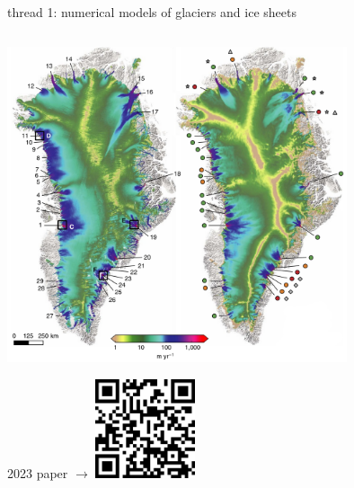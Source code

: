 \documentclass[svgnames,
               hyperref={colorlinks,citecolor=DeepPink4,linkcolor=FireBrick,urlcolor=Maroon},
               usepdftitle=false]  %
               {beamer}
\begin{document}
\begin{frame}{thread 1: numerical models of glaciers and ice sheets}
\begin{columns}
\begin{column}{0.55\textwidth}
\vspace{5mm}
\includegraphics[width=0.75\textwidth]{figs/gis-aschwanden2016.png}

\vspace{-11mm}
\hfill {\tiny 2023 paper $\to$} \quad \href{https://doi.org/10.1017/jog.2022.113}{\includegraphics[width=0.22\textwidth]{figs/QRperformance.png}}
\end{column}
\end{columns}
\end{frame}
\end{document}
